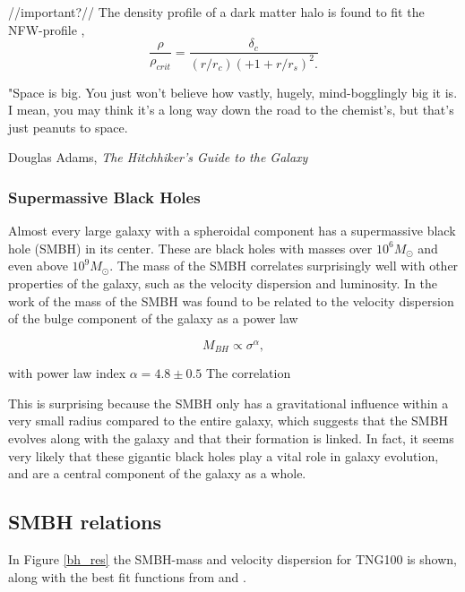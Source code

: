 //important?//
The density profile of a dark matter halo is found to fit the NFW-profile \parencite{Navarro1996},
\begin{equation}
    \frac{\rho}{\rho_{crit}} = \frac{\delta_c}{(r/r_c)(+1+r/r_s)^2.}
\end{equation}

\epigraph{"Space is big. You just won't believe how vastly, hugely, mind-bogglingly big it is. I mean, you may think it's a long way down the road to the chemist's, but that's just peanuts to space.}{Douglas Adams, \textit{The Hitchhiker's Guide to the Galaxy}}

\subsubsection{Supermassive Black Holes}
Almost every large galaxy with a spheroidal component has a supermassive black hole (SMBH) in its center. These are black holes with masses over $10^6 M_{\odot}$ and even above $10^9 M_{\odot}$. The mass of the SMBH correlates surprisingly well with other properties of the galaxy, such as the velocity dispersion and luminosity. In the work of \cite{Ferrarese2000} the mass of the SMBH was found to be related to the velocity dispersion of the bulge component of the galaxy as a power law


\begin{equation}
    M_{BH} \propto \sigma^{\alpha},
\end{equation}

with power law index $\alpha = 4.8 \pm 0.5$ The correlation 

This is surprising because the SMBH only has a gravitational influence within a very small radius compared to the entire galaxy, which suggests that the SMBH evolves along with the galaxy and that their formation is linked. In fact, it seems very likely that these gigantic black holes play a vital role in galaxy evolution, and are a central component of the galaxy as a whole.


\subsection{SMBH relations}
In Figure \ref{bh_res} the SMBH-mass and velocity dispersion for TNG100 is shown, along with the best fit functions from \cite{Ferrarese2000} and \cite{Tundo2007}.

